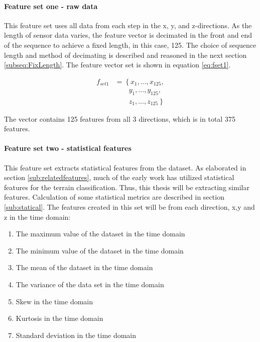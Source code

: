 \documentclass[USenglish]{ifimaster}  %
\begin{document}
\paragraph{Feature set one - raw data} 
This feature set uses all data from each step in the x, y, and z-directions. As the length of sensor data varies, the feature vector is decimated in the front and end of the sequence to achieve a fixed length, in this case, 125. The choice of sequence length and method of decimating is described and reasoned in the next section \ref{subseq:FixLength}. The feature vector set is shown in equation \ref{eq:fset1}.
	

\begin{align}\label{eq:fset1}
f_{set1} &= \left\{x_1,\dotsc,x_{125}, \right.\nonumber\\
&\qquad \left.{} y_1, \dotsc,y_{125}, \right.\nonumber\\
&\qquad \left.{} z_1,\dotsc,z_{125} \right\}
\end{align}

The vector contains 125 features from all 3 directions, which is in total 375 features.
	

		
		
	
\paragraph{Feature set two - statistical features} 
This feature set extracts statistical features from the dataset. As elaborated in section \ref{sub:relatedfeatures}, much of the early work has utilized statistical features for the terrain classification. Thus, this thesis will be extracting similar features. Calculation of some statistical metrics are described in section \ref{sub:statical}. The features created in this set will be from each direction, x,y and z in the time domain: 

	
	\begin{enumerate}
		\item The maximum value of the dataset in the time domain
		\item The minimum value of the dataset in the time domain
		\item The mean of the dataset in the time domain
		\item The variance of the data set in the time domain
		\item Skew in the time domain
		\item Kurtosis in the time domain 
		\item Standard deviation in the time domain
	\end{enumerate}
	
\end{document}
